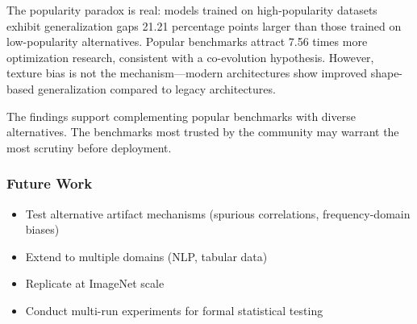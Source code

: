 
The popularity paradox is real: models trained on high-popularity datasets exhibit generalization gaps 21.21 percentage points larger than those trained on low-popularity alternatives. Popular benchmarks attract 7.56 times more optimization research, consistent with a co-evolution hypothesis. However, texture bias is not the mechanism---modern architectures show improved shape-based generalization compared to legacy architectures.

The findings support complementing popular benchmarks with diverse alternatives. The benchmarks most trusted by the community may warrant the most scrutiny before deployment.

\subsubsection{Future Work}

\begin{itemize}
\item Test alternative artifact mechanisms (spurious correlations, frequency-domain biases)
\item Extend to multiple domains (NLP, tabular data)
\item Replicate at ImageNet scale
\item Conduct multi-run experiments for formal statistical testing
\end{itemize}

